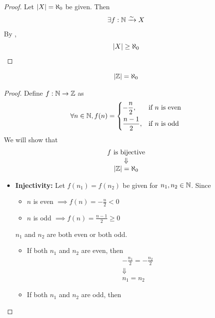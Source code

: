 \begin{proof}
    Let $\abs*{X} = \aleph_{0}$ be given. Then
    \[
    \exists f: \N \xrightarrow{\sim} X
    \]
    By ,
    \[
    \abs*{X} \geq \aleph_{0}
    \]
\end{proof}

\bigskip

\begin{theorem} \label{an:thm:Z-is-countable}
    \[
    \abs*{\Z} = \aleph_{0}
    \]
\end{theorem}

\begin{proof}
    Define $f: \N \to \Z$ as
    \[
    \forall n \in \N, f(n) = \begin{dcases}
        - \frac{n}{2}, & \text{if } n \text{ is even} \\
        \frac{n - 1}{2}, & \text{if } n \text{ is odd}
    \end{dcases}
    \]
    We will show that
    \[
    \begin{array}{c}
        f \text{ is bijective} \\
        \Downarrow \\
        \abs*{\Z} = \aleph_{0}
    \end{array}
    \]
    \begin{itemize}
        \item \textbf{Injectivity:} Let $f(n_{1}) = f(n_{2})$ be given for $n_{1}, n_{2} \in \N$. Since
        \begin{itemize}
            \item $n$ is even $\implies f(n) = - \frac{n}{2} < 0$
            \item $n$ is odd $\implies f(n) = \frac{n - 1}{2} \geq 0$
        \end{itemize}
        ${n_{1}}$ and ${n_{2}}$ are both even or both odd.
        \begin{itemize}
            \item If both $n_{1}$ and $n_{2}$ are even, then
            \[
            \begin{array}{c}
                - \frac{n_{1}}{2} = - \frac{n_{2}}{2} \\
                \Downarrow \\
                n_{1} = n_{2}
            \end{array}
            \]
            \item If both $n_{1}$ and $n_{2}$ are odd, then
            \[
\]
\end{itemize}
\end{itemize}
\end{proof}
